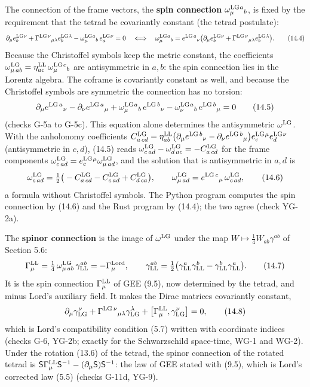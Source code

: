 \documentclass[
  10pt,
]{article}
\begin{document}
The connection of the frame vectors, the \textbf{spin connection}
\(\omega^{\rm LG}_\mu{}^a{}_b\), is fixed by the requirement that the
tetrad be covariantly constant (the tetrad postulate):
\[\partial_\mu e^{\rm LG}_b{}^\nu+\Gamma^{{\rm LG}\,\nu}{}_{\mu\lambda}e^{\rm LG}_b{}^\lambda-\omega^{\rm LG}_\mu{}^a{}_b\,e^{\rm LG}_a{}^\nu=0\quad\Longleftrightarrow\quad\omega^{\rm LG}_\mu{}^a{}_b=e^{{\rm LG}\,a}{}_\nu\big(\partial_\mu e^{\rm LG}_b{}^\nu+\Gamma^{{\rm LG}\,\nu}{}_{\mu\lambda}e^{\rm LG}_b{}^\lambda\big).\tag{14.4}\]
Because the Christoffel symbols keep the metric constant, the
coefficients
\(\omega^{\rm LG}_{\mu\,ab}=\eta^{\rm LL}_{ac}\,\omega^{\rm LG}_\mu{}^c{}_b\)
are antisymmetric in \(a,b\): the spin connection lies in the Lorentz
algebra. The coframe is covariantly constant as well, and because the
Christoffel symbols are symmetric the connection has no torsion:
\[\partial_\mu e^{{\rm LG}\,a}{}_\nu-\partial_\nu e^{{\rm LG}\,a}{}_\mu+\omega^{\rm LG}_\mu{}^a{}_b\,e^{{\rm LG}\,b}{}_\nu-\omega^{\rm LG}_\nu{}^a{}_b\,e^{{\rm LG}\,b}{}_\mu=0\tag{14.5}\]
(checks G-5a to G-5c). This equation alone determines the antisymmetric
\(\omega^{\rm LG}\). With the anholonomy coefficients
\(C^{\rm LG}_{a\,cd}=\eta^{\rm LL}_{ab}\big(\partial_\mu e^{{\rm LG}\,b}{}_\nu-\partial_\nu e^{{\rm LG}\,b}{}_\mu\big)e^{\rm LG}_c{}^\mu e^{\rm LG}_d{}^\nu\)
(antisymmetric in \(c,d\)), (14.5) reads
\(\omega^{\rm LG}_{c\,ad}-\omega^{\rm LG}_{d\,ac}=-C^{\rm LG}_{a\,cd}\)
for the frame components
\(\omega^{\rm LG}_{c\,ad}=e^{\rm LG}_c{}^\mu\omega^{\rm LG}_{\mu\,ad}\),
and the solution that is antisymmetric in \(a,d\) is
\[\omega^{\rm LG}_{c\,ad}=\tfrac12\big(-C^{\rm LG}_{a\,cd}-C^{\rm LG}_{c\,ad}+C^{\rm LG}_{d\,ca}\big),\qquad\omega^{\rm LG}_{\mu\,ad}=e^{{\rm LG}\,c}{}_\mu\,\omega^{\rm LG}_{c\,ad},\tag{14.6}\]
a formula without Christoffel symbols. The Python program computes the
spin connection by (14.6) and the Rust program by (14.4); the two agree
(check YG-2a).

The \textbf{spinor connection} is the image of \(\omega^{\rm LG}\) under
the map \(W\mapsto\frac14W_{ab}\gamma^{ab}\) of Section 5.6:
\[\Gamma^{\rm LL}_\mu=\tfrac14\,\omega^{\rm LG}_{\mu\,ab}\,\gamma^{ab}_{\rm LL}=-\Gamma^{\rm Lord}_\mu,\qquad\gamma^{ab}_{\rm LL}=\tfrac12\big(\gamma^a_{\rm LL}\gamma^b_{\rm LL}-\gamma^b_{\rm LL}\gamma^a_{\rm LL}\big).\tag{14.7}\]
It is the spin connection \(\Gamma^{\rm LL}_\mu\) of GEE (9.5), now
determined by the tetrad, and minus Lord's auxiliary field. It makes the
Dirac matrices covariantly constant,
\[\partial_\mu\gamma^\nu_{\rm LG}+\Gamma^{{\rm LG}\,\nu}{}_{\mu\lambda}\gamma^\lambda_{\rm LG}+\big[\Gamma^{\rm LL}_\mu,\gamma^\nu_{\rm LG}\big]=0,\tag{14.8}\]
which is Lord's compatibility condition (5.7) written with coordinate
indices (checks G-6, YG-2b; exactly for the Schwarzschild space-time,
WG-1 and WG-2). Under the rotation (13.6) of the tetrad, the spinor
connection of the rotated tetrad is
\(\mathsf S\Gamma^{\rm LL}_\mu\mathsf S^{-1}-(\partial_\mu\mathsf S)\mathsf S^{-1}\):
the law of GEE stated with (9.5), which is Lord's corrected law (5.5)
(checks G-11d, YG-9).
\end{document}
